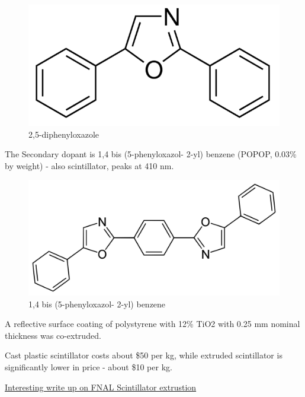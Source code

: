                 
            \begin{figure}[H]
    			\centering
    			\includegraphics[width=12cm]{CLAS-12/modules/clas-12-system/pics/fd/2-5-diphenyloxazole.png}
    			\caption{2,5-diphenyloxazole}
			\end{figure}
                
                The Secondary dopant is 1,4 bis (5-phenyloxazol- 2-yl) benzene (POPOP, 0.03\% by weight) - also scintillator, peaks at 410 nm. 
                
                                
            \begin{figure}[H]
    			\centering
    			\includegraphics[width=12cm]{CLAS-12/modules/clas-12-system/pics/fd/popop.png}
    			\caption{1,4 bis (5-phenyloxazol- 2-yl) benzene}
			\end{figure}
                
                
                
                A reflective surface coating of polystyrene with 12\% TiO2 with 0.25 mm nominal thickness was co-extruded. 
                
                Cast plastic scintillator costs about \$50 per kg, while extruded scintillator is significantly lower in price - about \$10 per kg. 
                
                \href{https://lss.fnal.gov/archive/2005/pub/fermilab-pub-05-344.pdf}{Interesting write up on FNAL Scintillator extrustion}


